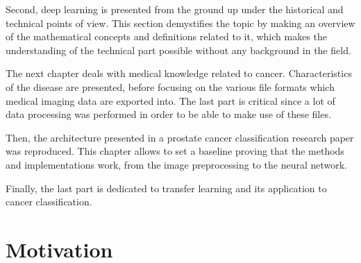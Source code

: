 Second, deep learning is presented from the ground up under the historical and technical points of view. This section demystifies the topic by making an overview of the mathematical concepts and definitions related to it, which makes the understanding of the technical part possible without any background in the field.

The next chapter deals with medical knowledge related to cancer. Characteristics of the disease are presented, before focusing on the various file formats which medical imaging data are exported into. The last part is critical since a lot of data processing was performed in order to be able to make use of these files.

Then, the architecture presented in a prostate cancer classification research paper was reproduced. This chapter allows to set a baseline proving that the methods and implementations work, from the image preprocessing to the neural network.

Finally, the last part is dedicated to transfer learning and its application to cancer classification.



\section{Motivation}

